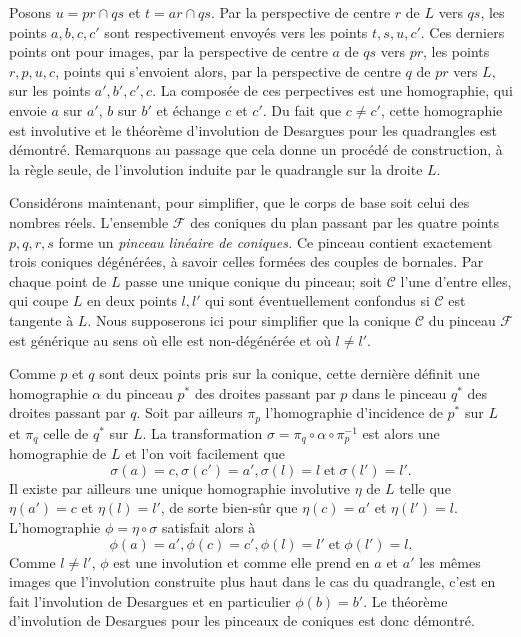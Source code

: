 \documentclass[12pt, a4paper]{article}
\newcommand{\cC}{\mathcal{C}}
\newcommand{\cF}{\mathcal{F}}
\begin{document}
Posons $u=pr\cap qs$ et $t=ar\cap qs$. Par la perspective de centre $r$ de $L$ vers $qs$, les points $a,b,c,c'$ sont respectivement envoyés vers les points $t,s,u,c'$. Ces derniers points ont pour images, par la perspective de centre $a$ de $qs$ vers $pr$, les points $r,p,u,c$, points qui s'envoient alors, par la perspective de centre $q$ de $pr$ vers $L$, sur les points $a',b',c', c$. La composée de ces perpectives est une homographie, qui envoie $a$ sur $a'$, $b$ sur $b'$ et échange $c$ et $c'$. Du fait que $c\neq c'$, cette homographie est involutive et le théorème d'involution de Desargues pour les quadrangles est démontré. Remarquons au passage que cela donne un procédé de construction, à la règle seule, de l'involution induite par le quadrangle sur la droite $L$. 

Considérons maintenant, pour simplifier, que le corps de base soit celui des nombres réels. L'ensemble $\cF$ des coniques du plan passant par les quatre points $p,q,r,s$ forme un \textit{pinceau linéaire de coniques.} Ce pinceau contient exactement trois coniques dégénérées, à savoir celles formées des couples de bornales. Par chaque point de $L$ passe une unique conique du pinceau; soit $\cC$ l'une d'entre elles, qui coupe $L$ en deux points $l,l'$ qui sont éventuellement confondus si $\cC$ est tangente à $L$. Nous supposerons ici pour simplifier que la conique $\cC$ du pinceau $\cF$ est générique au sens où elle est non-dégénérée et où $l\neq l'$.

Comme $p$ et $q$ sont deux points pris sur la conique, cette dernière définit une homographie $\alpha$ du pinceau $p^*$ des droites passant par $p$ dans le pinceau $q^*$ des droites passant par $q$. Soit par ailleurs $\pi_p$ l'homographie d'incidence de $p^*$ sur $L$ et $\pi_q$ celle de $q^*$ sur $L$. La transformation $\sigma=\pi_q\circ \alpha\circ \pi_p^{-1}$ est alors une homographie de $L$ et l'on voit facilement que
\[
\sigma(a)=c, \sigma(c')=a', \sigma(l)=l\;\mbox{et}\;\sigma(l')=l'.
\]
Il existe par ailleurs une unique homographie involutive $\eta$ de $L$ telle que $\eta(a')=c$ et $\eta(l)=l'$, de sorte bien-sûr que $\eta(c)=a'$ et $\eta(l')=l$. L'homographie $\phi=\eta\circ\sigma$ satisfait alors à
\[
\phi(a)=a', \phi(c)=c', \phi(l)=l'\;\mbox{et}\;\phi(l')=l.
\]
Comme $l\neq l'$, $\phi$ est une involution et comme elle prend en $a$ et $a'$ les mêmes images que l'involution construite plus haut dans le cas du quadrangle, c'est en fait l'involution de Desargues et en particulier $\phi(b)=b'$. Le théorème d'involution de Desargues pour les pinceaux de coniques est donc démontré.
\end{document}
